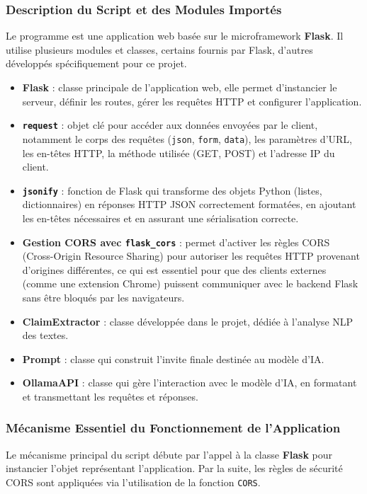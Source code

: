 \begin{description}
\begin{description}
\subsubsection{ Description du Script et des Modules Importés}

Le programme est une application web basée sur le microframework \textbf{Flask}. Il utilise plusieurs modules et classes, certains fournis par Flask, d’autres développés spécifiquement pour ce projet.

\begin{itemize}
    \item \textbf{Flask} : classe principale de l’application web, elle permet d’instancier le serveur, définir les routes, gérer les requêtes HTTP et configurer l’application.

    \item \textbf{\texttt{request}} : objet clé pour accéder aux données envoyées par le client, notamment le corps des requêtes (\texttt{json}, \texttt{form}, \texttt{data}), les paramètres d’URL, les en-têtes HTTP, la méthode utilisée (GET, POST) et l’adresse IP du client.

    \item \textbf{\texttt{jsonify}} : fonction de Flask qui transforme des objets Python (listes, dictionnaires) en réponses HTTP JSON correctement formatées, en ajoutant les en-têtes nécessaires et en assurant une sérialisation correcte.

    \item \textbf{Gestion CORS avec \texttt{flask\_cors}} : permet d’activer les règles CORS (Cross-Origin Resource Sharing) pour autoriser les requêtes HTTP provenant d’origines différentes, ce qui est essentiel pour que des clients externes (comme une extension Chrome) puissent communiquer avec le backend Flask sans être bloqués par les navigateurs.

    \item \textbf{ClaimExtractor} : classe développée dans le projet, dédiée à l’analyse NLP des textes.

    \item \textbf{Prompt} : classe qui construit l’invite finale destinée au modèle d’IA.

    \item \textbf{OllamaAPI} : classe qui gère l’interaction avec le modèle d’IA, en formatant et transmettant les requêtes et réponses.
\end{itemize}

\subsubsection*{Mécanisme Essentiel du Fonctionnement de l'Application}
Le mécanisme principal du script débute par l'appel à la classe \textbf{Flask} pour instancier l'objet représentant l'application. Par la suite, les règles de sécurité CORS sont appliquées via l'utilisation de la fonction \texttt{CORS}.


\end{description}
\end{description}
